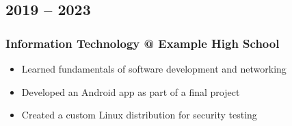 \documentclass[a4paper,10pt]{article}
\begin{document}
\begin{minipage}[t][0.8\textheight]{0.6\textwidth}
    \subsection{2019 – 2023}
    \subsubsection{Information Technology @ Example High School}
    \begin{itemize}[noitemsep,topsep=0pt]
        \item Learned fundamentals of software development and networking
        \item Developed an Android app as part of a final project
        \item Created a custom Linux distribution for security testing
    \end{itemize}
\end{minipage}
\end{document}
